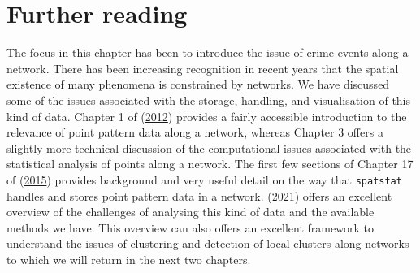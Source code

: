 \documentclass[
  krantz2]{krantz}
\begin{document}
\hypertarget{further-reading}{%
\section{Further reading}\label{further-reading}}

The focus in this chapter has been to introduce the issue of crime events along a network. There has been increasing recognition in recent years that the spatial existence of many phenomena is constrained by networks. We have discussed some of the issues associated with the storage, handling, and visualisation of this kind of data. Chapter 1 of (\protect\hyperlink{ref-Okabe_2012}{2012}) provides a fairly accessible introduction to the relevance of point pattern data along a network, whereas Chapter 3 offers a slightly more technical discussion of the computational issues associated with the statistical analysis of points along a network. The first few sections of Chapter 17 of (\protect\hyperlink{ref-Baddeley_2016}{2015}) provides background and very useful detail on the way that \texttt{spatstat} handles and stores point pattern data in a network. (\protect\hyperlink{ref-Baddeley_2021}{2021}) offers an excellent overview of the challenges of analysing this kind of data and the available methods we have. This overview can also offers an excellent framework to understand the issues of clustering and detection of local clusters along networks to which we will return in the next two chapters.
\end{document}
